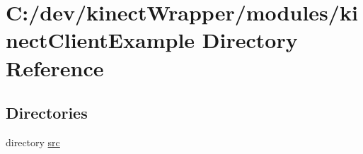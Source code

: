 \section{C\+:/dev/kinect\+Wrapper/modules/kinect\+Client\+Example Directory Reference}
\label{dir_315e5efb410a16c3dc704eab1dfa1351}
\subsection*{Directories}
\begin{DoxyCompactItemize}
\item 
directory \hyperlink{dir_451f07972b1bbda26c737cb09edda0a4}{src}
\end{DoxyCompactItemize}

